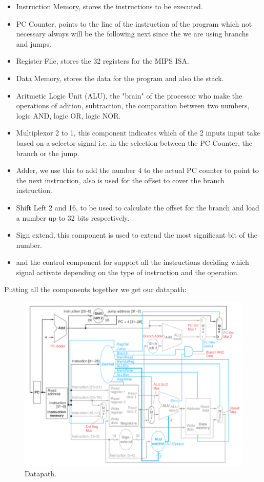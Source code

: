 \documentclass[conference]{IEEEtran}
\begin{document}
\begin{itemize}
\item Instruction Memory, stores the instructions to be executed.
\item PC Counter, points to the line of the instruction of the program which not 
necessary always will be the following next since the we are using branchs and
jumps.
\item Register File, stores the 32 registers for the MIPS ISA. 
\item Data Memory, stores the data for the program and also the stack.
\item Aritmetic Logic Unit (ALU), the "brain" of the processor who make the operations of
adition, subtraction, the comparation between two numbers, logic AND, logic OR, logic NOR.
\item Multiplexor 2 to 1, this component indicates which of the 2 inputs input take based on a 
selector signal i.e. in the selection between the PC Counter, the branch or the jump.
\item Adder, we use this to add the number 4 to the actual PC counter to point to the next 
instruction, also is used for the offset to cover the branch instruction.
\item Shift Left 2 and 16, to be used to calculate the offset for the branch and load a number 
up to 32 bits respectively.
\item Sign extend, this component is used to extend the most significant bit of the number.
\item and the control component for support all the instructions deciding which signal activate 
depending on the type of instruction and the operation.
\end{itemize}

Putting all the components together we get our datapath:
\begin{figure}[h]
\includegraphics[scale=2]{datapath.png}
\caption{Datapath.}
\end{figure}
\end{document}

